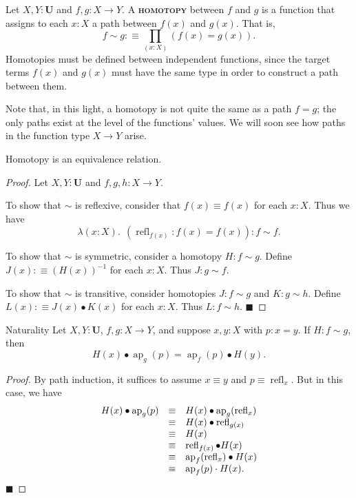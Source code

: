 \documentclass{article}
\newcommand{\defn}[1]{{\scshape\bfseries\color{MPBemph}#1}}
\renewcommand{\qed}{\hfill{\color{MPBthm}\( \blacksquare \)}}
\newcommand{\eql}{\mathbin{:\equiv}}
\newcommand{\U}{\mathbf{U}}
\newcommand{\tpi}[1]{\prod_{(#1)}}
\newcommand{\1}{\textbf{1}}
\newcommand{\0}{\mathbf{0}}
\newcommand{\2}{\textbf{2}}
\DeclareMathOperator{\refl}{refl}
\DeclareMathOperator{\ap}{ap}
\begin{document}
Let \( X, Y : \U \) and \( f, g : X \to Y \). A \defn{homotopy} between \( f \) and \( g \) is a function that assigns to each \( x : X \) a path between \( f(x) \) and \( g(x) \). That is,
\[ f \sim g \eql \tpi{x : X} (f(x) = g(x)). \]
Homotopies must be defined between independent functions, since the target terms \( f(x) \) and \( g(x) \) must have the same type in order to construct a path between them.

Note that, in this light, a homotopy is not quite the same as a path \( f = g \); the only paths exist at the level of the functions' values. We will soon see how paths in the function type \( X \to Y \) arise.
\begin{lemma}{}{} Homotopy is an equivalence relation.
\begin{proof}
	Let \( X, Y : \U \) and \( f, g, h : X \to Y \).
	
	To show that \( \sim \) is reflexive, consider that \( f(x) \equiv f(x) \) for each \( x : X \). Thus we have
	\[ \lambda(x : X).~~(\refl_{f(x)} : f(x) = f(x)) : f \sim f. \]
	
	To show that \( \sim \) is symmetric, consider a homotopy \( H : f \sim g \). Define \( J(x) \eql (H(x))^{-1} \) for each \( x : X \). Thus \( J : g \sim f \).
	
	To show that \( \sim \) is transitive, consider homotopies \( J : f \sim g \) and \( K : g \sim h \). Define \( L(x) \eql J(x) \bullet K(x) \) for each \( x : X \). Thus \( L : f \sim h \). \qed
\end{proof} \end{lemma}
\begin{thm}{Naturality}{} Let \( X, Y : \U \), \( f, g : X \to Y \), and suppose \( x, y : X \) with \( p : x = y \). If \( H : f \sim g \), then
\[ H(x) \bullet \ap_{g}(p) = \ap_{f}(p) \bullet H(y). \]
\begin{proof}
	By path induction, it suffices to assume \( x \equiv y \) and \( p \equiv \refl_{x} \). But in this case, we have
	\[ \begin{array}{rcl}
		H(x) \bullet \ap_{g}(p) &\equiv& H(x) \bullet \ap_{g}(\refl_{x}) \\
		&\equiv& H(x) \bullet \refl_{g(x)} \\
		&\equiv& H(x) \\
		&\equiv& \refl_{f(x)} \bullet H(x) \\
		&\equiv& \ap_{f}(\refl_{x}) \bullet H(x) \\
		&\equiv& \ap_{f}(p) \cdot H(x).
	\end{array}\vspace{-18pt} \] \qed\vspace{3pt}
\end{proof} \end{thm}
\end{document}
